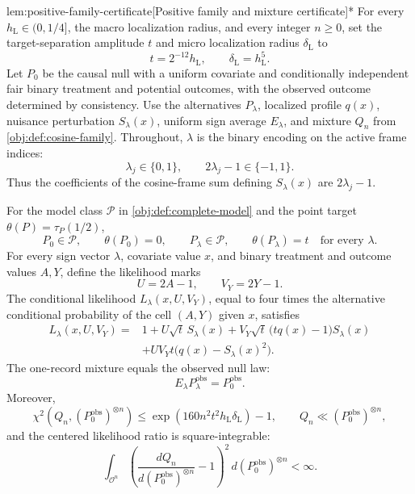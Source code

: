 \begin{lemmav}{lem:positive-family-certificate}[Positive family and mixture certificate]*
For every \(h_{\mathrm L}\in(0,1/4]\), the macro localization radius, and every integer \(n\ge0\), set the target-separation amplitude \(t\) and micro localization radius \(\delta_{\mathrm L}\) to
\[
t=2^{-12}h_{\mathrm L},
\qquad
\delta_{\mathrm L}=h_{\mathrm L}^{5}.
\]
Let \(P_0\) be the causal null with a uniform covariate and conditionally independent fair binary treatment and potential outcomes, with the observed outcome determined by consistency. Use the alternatives \(P_\lambda\), localized profile \(q(x)\), nuisance perturbation \(S_\lambda(x)\), uniform sign average \(E_\lambda\), and mixture \(Q_n\) from \cref{obj:def:cosine-family}. Throughout, \(\lambda\) is the binary encoding on the active frame indices:
\[
\lambda_j\in\{0,1\},
\qquad
2\lambda_j-1\in\{-1,1\}.
\]
Thus the coefficients of the cosine-frame sum defining \(S_\lambda(x)\) are \(2\lambda_j-1\).

For the model class \(\mathcal P\) in \cref{obj:def:complete-model} and the point target \(\theta(P)=\tau_P(1/2)\),
\[
P_0\in\mathcal P,\qquad
\theta(P_0)=0,\qquad
P_\lambda\in\mathcal P,\qquad
\theta(P_\lambda)=t
\quad\text{for every }\lambda.
\]
For every sign vector \(\lambda\), covariate value \(x\), and binary treatment and outcome values \(A,Y\), define the likelihood marks
\[
U=2A-1,\qquad V_Y=2Y-1.
\]
The conditional likelihood \(L_\lambda(x,U,V_Y)\), equal to four times the alternative conditional probability of the cell \((A,Y)\) given \(x\), satisfies
\[
\begin{aligned}
L_\lambda(x,U,V_Y)
={}&1+U\sqrt t\,S_\lambda(x)
 +V_Y\sqrt t\,\bigl(tq(x)-1\bigr)S_\lambda(x)\\
&+UV_Yt\bigl(q(x)-S_\lambda(x)^2\bigr).
\end{aligned}
\]
The one-record mixture equals the observed null law:
\[
E_\lambda P_\lambda^{\mathrm{obs}}=P_0^{\mathrm{obs}}.
\]
Moreover,
\[
\chi^2\!\left(Q_n,(P_0^{\mathrm{obs}})^{\otimes n}\right)
\le
\exp\!\left(160n^2t^2h_{\mathrm L}\delta_{\mathrm L}\right)-1,
\qquad
Q_n\ll(P_0^{\mathrm{obs}})^{\otimes n},
\]
and the centered likelihood ratio is square-integrable:
\[
\int_{\mathcal O^n}
\left(
\frac{dQ_n}{d(P_0^{\mathrm{obs}})^{\otimes n}}-1
\right)^2
\,d(P_0^{\mathrm{obs}})^{\otimes n}
<\infty.
\]
\end{lemmav}

